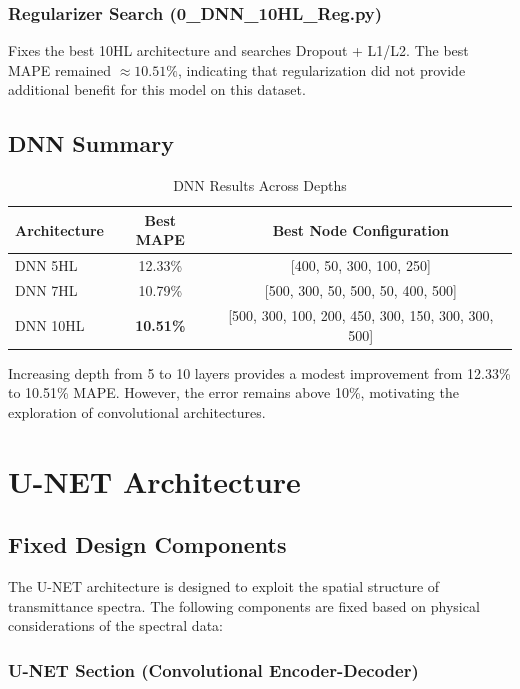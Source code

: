\documentclass[11pt,a4paper]{article}
\begin{document}
\subsubsection*{Regularizer Search (0\_DNN\_10HL\_Reg.py)}

Fixes the best 10HL architecture and searches Dropout + L1/L2. The best MAPE remained $\approx 10.51\%$, indicating that regularization did not provide additional benefit for this model on this dataset.

\subsection{DNN Summary}

\begin{table}[H]
\centering
\caption{DNN Results Across Depths}
\begin{tabular}{lcc}
\toprule
\textbf{Architecture} & \textbf{Best MAPE} & \textbf{Best Node Configuration} \\
\midrule
DNN 5HL  & 12.33\% & [400, 50, 300, 100, 250] \\
DNN 7HL  & 10.79\% & [500, 300, 50, 500, 50, 400, 500] \\
DNN 10HL & \textbf{10.51\%} & [500, 300, 100, 200, 450, 300, 150, 300, 300, 500] \\
\bottomrule
\end{tabular}
\end{table}

Increasing depth from 5 to 10 layers provides a modest improvement from 12.33\% to 10.51\% MAPE. However, the error remains above 10\%, motivating the exploration of convolutional architectures.

\section{U-NET Architecture}

\subsection{Fixed Design Components}

The U-NET architecture is designed to exploit the spatial structure of transmittance spectra. The following components are fixed based on physical considerations of the spectral data:

\subsubsection*{U-NET Section (Convolutional Encoder-Decoder)}
\end{document}
